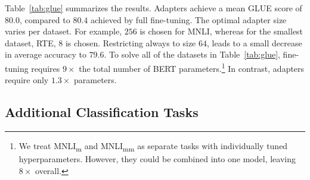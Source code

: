 Table~\ref{tab:glue} summarizes the results.
Adapters achieve a mean GLUE score of $80.0$, compared to $80.4$ achieved by full fine-tuning.
The optimal adapter size varies per dataset. For example, $256$ is chosen for MNLI, whereas for the smallest dataset, RTE, $8$ is chosen.
Restricting always to size $64$, leads to a small decrease in average accuracy to $79.6$.
To solve all of the datasets in Table~\ref{tab:glue}, fine-tuning requires $9\times$ the total number of BERT parameters.\footnote{
We treat MNLI\textsubscript{m} and MNLI\textsubscript{mm} as separate tasks with individually tuned hyperparameters.
However, they could be combined into one model, leaving $8\times$ overall.}
In contrast, adapters require only $1.3\times$ parameters.

\subsection{Additional Classification Tasks}

